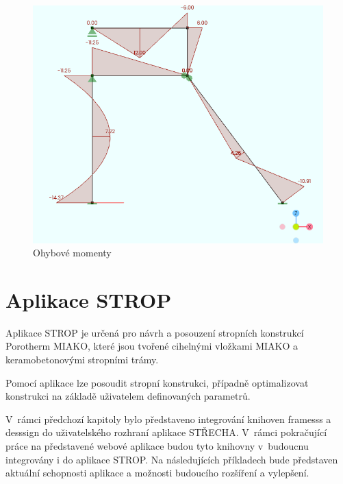 \begin{figure}[H]
    \includegraphics{assets/figures/wbapp/example/moments.png}
    \caption{Ohybové momenty}
    \label{fig:wb_app_example_moments}
\end{figure}

\section{Aplikace STROP}
Aplikace STROP je určená pro návrh a posouzení stropních konstrukcí Porotherm MIAKO, které jsou tvořené cihelnými vložkami MIAKO a keramobetonovými stropními trámy.

Pomocí aplikace lze posoudit stropní konstrukci, případně optimalizovat konstrukci na základě uživatelem definovaných parametrů.

V~rámci předchozí kapitoly bylo představeno integrování knihoven framesss a desssign do uživatelského rozhraní aplikace STŘECHA. V~rámci pokračující práce na představené webové aplikace budou tyto knihovny v~budoucnu integrovány i do aplikace STROP. Na následujících příkladech bude představen aktuální schopnosti aplikace a možnosti budoucího rozšíření a vylepšení.

